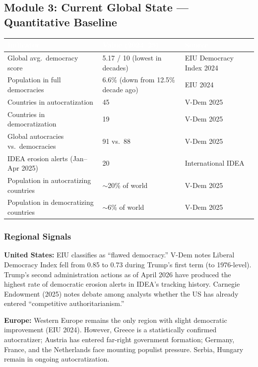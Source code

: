 \documentclass[11pt,letterpaper]{article}
\newcommand{\tableheader}[1]{\textbf{\sffamily\textcolor{white}{#1}}}
\begin{document}
\subsection{Module 3: Current Global State --- Quantitative Baseline}

\begin{center}
\begin{tabularx}{\textwidth}{L{4cm}L{3cm}X}
\toprule
{}
\tableheader{Indicator} & \tableheader{Value (2024--25)} & \tableheader{Source} \\
\midrule
Global avg.\ democracy score & 5.17 / 10 (lowest in decades) & EIU Democracy Index 2024 \\
Population in full democracies & 6.6\% (down from 12.5\% decade ago) & EIU 2024 \\
Countries in autocratization & 45 & V-Dem 2025 \\
Countries in democratization & 19 & V-Dem 2025 \\
Global autocracies vs.\ democracies & 91 vs.\ 88 & V-Dem 2025 \\
IDEA erosion alerts (Jan--Apr 2025) & 20 & International IDEA \\
Population in autocratizing countries & $\sim$20\% of world & V-Dem 2025 \\
Population in democratizing countries & $\sim$6\% of world & V-Dem 2025 \\
\bottomrule
\end{tabularx}
\end{center}

\subsubsection{Regional Signals}

\textbf{United States:} EIU classifies as ``flawed democracy.'' V-Dem notes Liberal Democracy Index fell from 0.85 to 0.73 during Trump's first term (to 1976-level). Trump's second administration actions as of April 2026 have produced the highest rate of democratic erosion alerts in IDEA's tracking history. Carnegie Endowment (2025) notes debate among analysts whether the US has already entered ``competitive authoritarianism.''

\textbf{Europe:} Western Europe remains the only region with slight democratic improvement (EIU 2024). However, Greece is a statistically confirmed autocratizer; Austria has entered far-right government formation; Germany, France, and the Netherlands face mounting populist pressure. Serbia, Hungary remain in ongoing autocratization.
\end{document}
